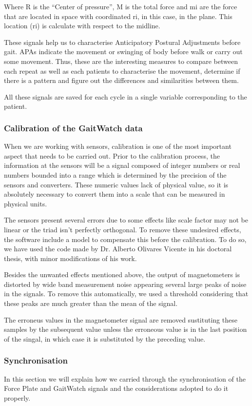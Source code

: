 Where R is the “Center of pressure”, M is the total force and mi are the force that are located in space with coordinated ri, in this case, in the plane. This location (ri) is calculate with respect to the midline.

These signals help us to characterise Anticipatory Postural Adjustments  before gait.  APAs indicate the movement or swinging of body before walk or carry out some movement. Thus, these are the interesting  measures to compare between each repeat as well as each patients to characterise the movement, determine if there is a pattern and figure out the differences and similarities between them.

All these signals are saved for each cycle in a single variable corresponding to the patient.


\subsubsection{Calibration of the GaitWatch data}
When we are working with sensors, calibration is one of the most important aspect that needs to be carried out. Prior to the calibration process,
the information at the sensors  will be a signal composed of integer
numbers  or real numbers bounded into a range which is determined by the precision of the sensors and converters. These numeric values lack of physical value, so it is absolutely necessary to convert them into a scale that can be measured in physical units.

The sensors present several errors due to some effects like scale factor may not be linear or the triad isn’t perfectly orthogonal. To remove these undesired effects, the software include a model to compensate this before the calibration. 
To do so, we have used the code made by Dr. Alberto Olivares Vicente in his doctoral thesis, with minor modifications of his work.

Besides the unwanted effects mentioned above, the output of magnetometers is distorted by wide band measurement noise appearing several large peaks of noise in the signals. To remove this automatically, we used a threshold considering that these peaks are much greater than the mean of the signal.


The erroneus values in the magnetometer signal are removed sustituting these samples by the subsequent value unless the erroneous value is in the last position of the singal, in which case it is substituted by the preceding value.

\subsubsection{Synchronisation}	
In this section we will explain how we carried through the synchronisation of the Force Plate and GaitWatch signals and the considerations adopted to do it properly.

